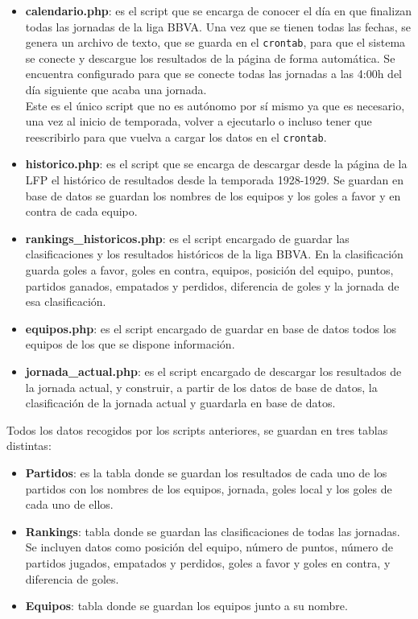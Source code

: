\begin{itemize}
\item \textbf{calendario.php}: es el script que se encarga de conocer el día en que finalizan todas las jornadas de la liga BBVA. Una vez que se tienen todas las fechas, se genera un archivo de texto, que se guarda en el \texttt{crontab}, para que el sistema se conecte y descargue los resultados de la página de forma automática. Se encuentra configurado para que se conecte todas las jornadas a las 4:00h del día siguiente que acaba una jornada.\\
Este es el único script que no es autónomo por sí mismo ya que es necesario, una vez al inicio de temporada, volver a ejecutarlo o incluso tener que reescribirlo para que vuelva a cargar los datos en el \texttt{crontab}.

\item \textbf{historico.php}: es el script que se encarga de descargar desde la página de la LFP el histórico de resultados desde la temporada 1928-1929. Se guardan en base de datos se guardan los nombres de los equipos y los goles a favor y en contra de cada equipo.

\item \textbf{rankings\_historicos.php}: es el script encargado de guardar las clasificaciones y los resultados históricos de la liga BBVA. En la clasificación guarda goles a favor, goles en contra, equipos, posición del equipo, puntos, partidos ganados, empatados y perdidos, diferencia de goles y la jornada de esa clasificación.

\item \textbf{equipos.php}: es el script encargado de guardar en base de datos todos los equipos de los que se dispone información.

\item \textbf{jornada\_actual.php}: es el script encargado de descargar los resultados de la jornada actual, y construir, a partir de los datos de base de datos, la clasificación de la jornada actual y guardarla en base de datos.

\end{itemize}

Todos los datos recogidos por los scripts anteriores, se guardan en tres tablas distintas:

\begin{itemize}
\item \textbf{Partidos}: es la tabla donde se guardan los resultados de cada uno de los partidos con los nombres de los equipos, jornada, goles local y los goles de cada uno de ellos.

\item \textbf{Rankings}: tabla donde se guardan las clasificaciones de todas las jornadas. Se incluyen datos como posición del equipo, número de puntos, número de partidos jugados, empatados y perdidos, goles a favor y goles en contra, y diferencia de goles.

\item \textbf{Equipos}: tabla donde se guardan los equipos junto a su nombre.
\end{itemize}

